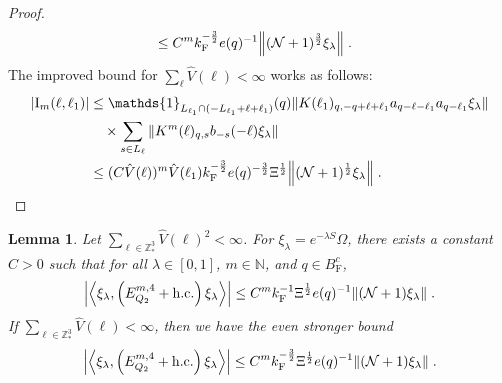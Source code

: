 \documentclass[12pt,a4paper]{article}
\numberwithin{equation}{section}
\newcommand{\NNN}{\mathbb{N}}
\newcommand{\1}{\mathbb{I}}
\newcommand{\F}{\mathrm{F}}
\newcommand{\I}{\mathrm{I}}
\newcommand{\Z}{\mathbb{Z}}
\newcommand{\NN}{\mathcal{N}}
\newcommand{\half}{\frac{1}{2}}
\newcommand{\eva}[1]{\left\langle #1 \right\rangle}
\theoremstyle{plain}
\newtheorem{lemma}[theorem]{Lemma}
\theoremstyle{definition}
\theoremstyle{remark}
\theoremstyle{plain}
\theoremstyle{definition}
\theoremstyle{remark}
\begin{document}
\begin{proof}
\begin{align}
	&\leq C^m k_{\F}^{-\frac 32} e(q)^{-1}
		\norm{(\NN+1)^{\frac 32} \xi_\lambda} \;. \label{eq:estEQ2153_Coulomb}
\end{align}
The improved bound for $ \sum_\ell \hat{V}(\ell) < \infty $ works as follows:
\begin{align}
	|\I_m(\ell, \ell_1)|
	&\leq \mathds{1}_{L_{\ell_1} \cap (-L_{\ell_1} + \ell + \ell_1)}(q) \norm{K(\ell_1)_{q,-q+\ell+\ell_1} a_{q-\ell-\ell_1} a_{q-\ell_1} \xi_\lambda}  \label{eq:estEQ2153} \\
	& \quad \times
		\sum_{ s \in L_{\ell}}
		\norm{ K^m(\ell)_{q,s} b_{-s}(-\ell) \xi_\lambda }\nonumber\\
	&\leq (C \hat{V}(\ell))^m
		\hat{V}(\ell_1)
		k_{\F}^{-\frac 32} e(q)^{-\frac 32} \Xi^\half
		\norm{(\NN+1)^\half\xi_\lambda} \;. \qedhere \nonumber
\end{align}
\end{proof}


\begin{lemma} \label{lem:EQ217}
Let $ \sum_{\ell \in \Z^3_*} \hat{V}(\ell)^2 < \infty $. For $\xi_\lambda = e^{-\lambda S} \Omega$, there exists a constant $ C > 0 $ such that for all $ \lambda \in [0,1] $, $ m \in \NNN $, and $ q \in B_{\F}^c $,
\begin{align}
	\abs{\eva{\xi_\lambda,\left(E^{m,4}_{Q_2}+\mathrm{h.c.}\right) \xi_\lambda }}
	\leq C^m k_{\F}^{-1} \Xi^{\half}  e(q)^{-1} 
		\norm{(\NN+1) \xi_\lambda } \;. \label{eq:estEQ217_Coulomb}
\end{align}
If $ \sum_{\ell \in \Z^3_*} \hat{V}(\ell) < \infty $, then we have the even stronger bound
\begin{align}
	\abs{\eva{\xi_\lambda,\left(E^{m,4}_{Q_2}+\mathrm{h.c.}\right) \xi_\lambda }}
	\leq C^m k_{\F}^{-\frac 32} \Xi^{\half}  e(q)^{-1} 
		\norm{(\NN+1) \xi_\lambda } \;. \label{eq:estEQ217}
\end{align}
\end{lemma}
\end{document}
